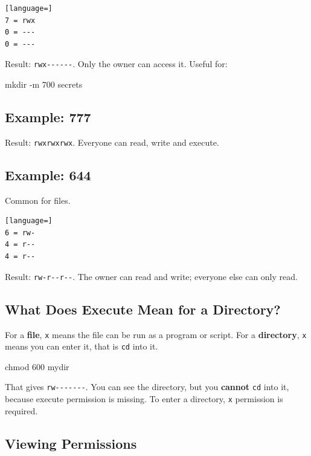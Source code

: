 \documentclass[11pt,a4paper]{article}
\begin{document}
\begin{lstlisting}[language=]
7 = rwx
0 = ---
0 = ---
\end{lstlisting}

Result: \lstinline|rwx------|. Only the owner can access it. Useful for:

\begin{sh}
mkdir -m 700 secrets
\end{sh}

\subsection{Example: 777}

Result: \lstinline|rwxrwxrwx|. Everyone can read, write and execute.


\subsection{Example: 644}

Common for files.

\begin{lstlisting}[language=]
6 = rw-
4 = r--
4 = r--
\end{lstlisting}

Result: \lstinline|rw-r--r--|. The owner can read and write; everyone else can only read.

\subsection{What Does Execute Mean for a Directory?}

For a \textbf{file}, \texttt{x} means the file can be run as a program or script. For a
\textbf{directory}, \texttt{x} means you can enter it, that is \lstinline|cd| into it.

\begin{sh}
chmod 600 mydir
\end{sh}

That gives \lstinline|rw-------|. You can see the directory, but you \textbf{cannot}
\lstinline|cd| into it, because execute permission is missing. To enter a directory,
\texttt{x} permission is required.

\subsection{Viewing Permissions}
\end{document}

